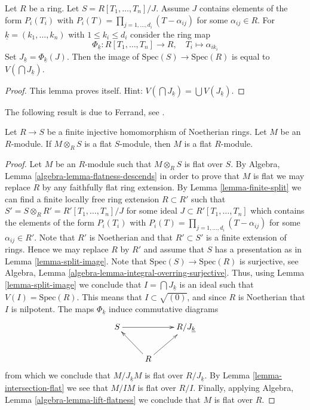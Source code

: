 \begin{lemma}
\label{lemma-split-image}
Let $R$ be a ring.
Let $S = R[T_1, \ldots, T_n]/J$.
Assume $J$ contains elements of the form $P_i(T_i)$
with $P_i(T) = \prod_{j = 1, \ldots, d_i} (T - \alpha_{ij})$ for some
$\alpha_{ij} \in R$. For $\underline{k} = (k_1, \ldots, k_n)$
with $1 \leq k_i \leq d_i$ consider the ring map
$$
\Phi_{\underline{k}} : R[T_1, \ldots, T_n] \to R,
\quad
T_i \longmapsto \alpha_{ik_i}
$$
Set $J_{\underline{k}} = \Phi_{\underline{k}}(J)$.
Then the image of $\text{Spec}(S) \to \text{Spec}(R)$ is equal to
$V(\bigcap J_{\underline{k}})$.
\end{lemma}

\begin{proof}
This lemma proves itself. Hint:
$V(\bigcap J_{\underline{k}}) = \bigcup V(J_{\underline{k}})$.
\end{proof}

\noindent
The following result is due to Ferrand, see \cite{Ferrand}.

\begin{lemma}
\label{lemma-descent-flatness-injective-finite-Noetherian-rings}
Let $R \to S$ be a finite injective homomorphism of Noetherian rings.
Let $M$ be an $R$-module. If $M \otimes_R S$ is a flat $S$-module,
then $M$ is a flat $R$-module.
\end{lemma}

\begin{proof}
Let $M$ be an $R$-module such that $M \otimes_R S$ is flat over $S$. By
Algebra, Lemma \ref{algebra-lemma-flatness-descends}
in order to prove that $M$ is flat we may replace $R$ by any faithfully flat
ring extension. By
Lemma \ref{lemma-finite-split}
we can find a finite locally free ring extension $R \subset R'$ such
that $S' = S \otimes_R R' = R'[T_1, \ldots, T_n]/J$ for some ideal
$J \subset R'[T_1, \ldots, T_n]$ which contains the  elements of the form
$P_i(T_i)$ with $P_i(T) = \prod_{j = 1, \ldots, d_i} (T - \alpha_{ij})$
for some $\alpha_{ij} \in R'$. Note that $R'$ is Noetherian
and that $R' \subset S'$ is a finite extension of rings. Hence we may
replace $R$ by $R'$ and assume that $S$ has a presentation as in
Lemma \ref{lemma-split-image}.
Note that $\text{Spec}(S) \to \text{Spec}(R)$ is surjective, see
Algebra, Lemma \ref{algebra-lemma-integral-overring-surjective}.
Thus, using
Lemma \ref{lemma-split-image}
we conclude that $I = \bigcap J_{\underline{k}}$ is an ideal
such that $V(I) = \text{Spec}(R)$. This means that
$I \subset \sqrt{(0)}$, and since $R$ is Noetherian that $I$
is nilpotent. The maps $\Phi_{\underline{k}}$ induce commutative
diagrams
$$
\xymatrix{
S \ar[rr] & & R/J_{\underline{k}} \\
& R \ar[lu] \ar[ru]
}
$$
from which we conclude that $M/J_{\underline{k}}M$ is flat over
$R/J_{\underline{k}}$. By
Lemma \ref{lemma-intersection-flat}
we see that $M/IM$ is flat over $R/I$. Finally, applying
Algebra, Lemma \ref{algebra-lemma-lift-flatness}
we conclude that $M$ is flat over $R$.
\end{proof}

